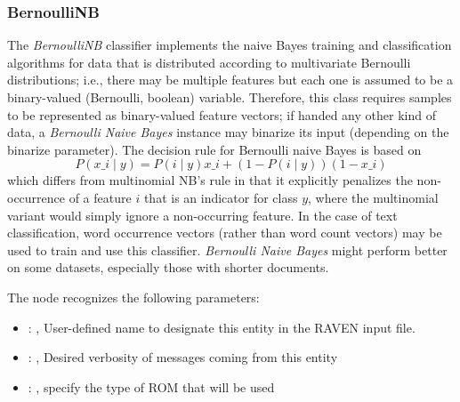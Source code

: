 \subsubsection{BernoulliNB}
  The \textit{BernoulliNB} classifier implements the naive Bayes training and
  classification algorithms for data that is distributed according to multivariate
  Bernoulli distributions; i.e., there may be multiple features but each one is
  assumed to be a binary-valued (Bernoulli, boolean) variable.                          Therefore,
  this class requires samples to be represented as binary-valued                          feature
  vectors; if handed any other kind of data, a \textit{Bernoulli Naive
  Bayes} instance may binarize its input (depending on the binarize parameter).
  The decision rule for Bernoulli naive Bayes is based on                          \begin{equation}
  P(x\_i \mid y) = P(i \mid y) x\_i + (1 - P(i \mid y)) (1 - x\_i)
  \end{equation}                          which differs from multinomial NB's rule in that it
  explicitly penalizes the                          non-occurrence of a feature $i$ that is an
  indicator for class $y$, where the                          multinomial variant would simply
  ignore a non-occurring feature.                          In the case of text classification, word
  occurrence vectors (rather than word                          count vectors) may be used to train
  and use this classifier.                          \textit{Bernoulli Naive Bayes} might perform
  better on some datasets, especially                          those with shorter documents.

  The  node recognizes the following parameters:
    \begin{itemize}
      \item {}: , 
        User-defined name to designate this entity in the RAVEN input file.
      \item {}: , 
        Desired verbosity of messages coming from this entity
      \item {}: , 
        specify the type of ROM that will be used
  \end{itemize}

